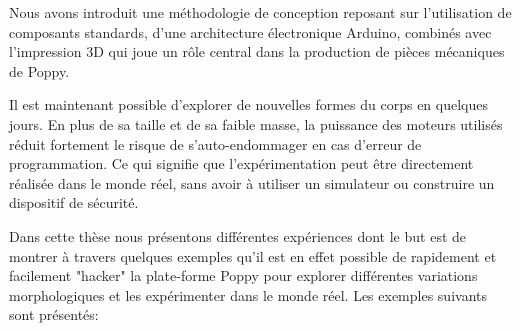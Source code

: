Nous avons introduit une méthodologie de conception reposant sur l'utilisation de composants standards, d'une architecture électronique Arduino, combinés avec l'impression 3D qui joue un rôle central dans la production de pièces mécaniques de Poppy.

Il est maintenant possible d'explorer de nouvelles formes du corps en quelques jours. En plus de sa taille et de sa faible masse, la puissance des moteurs utilisés réduit fortement le risque de s'auto-endommager en cas d'erreur de programmation. Ce qui signifie que l'expérimentation peut être directement réalisée dans le monde réel, sans avoir à utiliser un simulateur ou construire un dispositif de sécurité.

Dans cette thèse nous présentons différentes expériences dont le but est de montrer à travers quelques exemples qu'il est en effet possible de rapidement et facilement "hacker" la plate-forme Poppy pour explorer différentes variations morphologiques et les expérimenter dans le monde réel. 
Les exemples suivants sont présentés:
